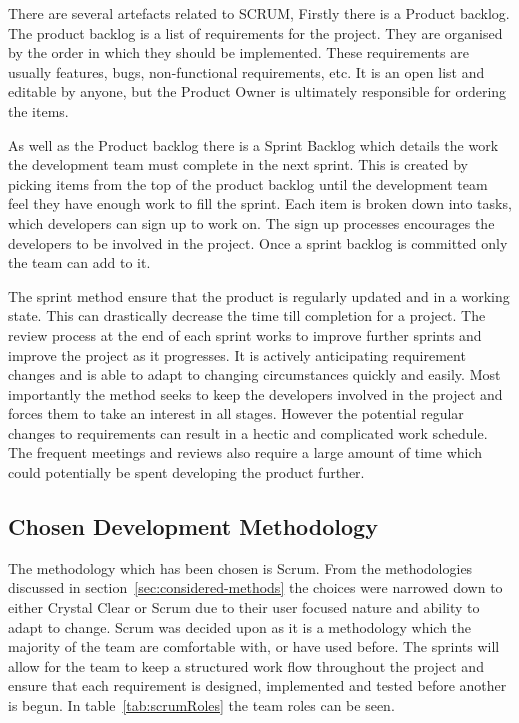 \documentclass[11pt,a4paper]{article}
\begin{document}
There are several artefacts related to SCRUM, Firstly there is a Product backlog. The product backlog is a list of requirements for the project. They are organised by the order in which they should be implemented. These requirements are usually features, bugs, non-functional requirements, etc. It is an open list and editable by anyone, but the Product Owner is ultimately responsible for ordering the items. 

As well as the Product backlog there is a Sprint Backlog which details the work the development team must complete in the next sprint. This is created by picking items from the top of the product backlog until the development team feel they have enough work to fill the sprint. Each item is broken down into tasks, which developers can sign up to work on. The sign up processes encourages the developers to be involved in the project. Once a sprint backlog is committed only the team can add to it.

The sprint method ensure that the product is regularly updated and in a working state. This can drastically decrease the time till completion for a project. The review process at the end of each sprint works to improve further sprints and improve the project as it progresses. It is actively anticipating requirement changes and is able to adapt to changing circumstances quickly and easily. Most importantly the method seeks to keep the developers involved in the project and forces them to take an interest in all stages. However the potential regular changes to requirements can result in a hectic and complicated work schedule. The frequent meetings and reviews also require a large amount of time which could potentially be spent developing the product further. 

\subsection{Chosen Development Methodology}
\label{sec:chosen-method}

The methodology which has been chosen is Scrum. From the methodologies discussed in section~\ref{sec:considered-methods} the choices were narrowed down to either Crystal Clear or Scrum due to their user focused nature and ability to adapt to change. Scrum was decided upon as it is a methodology which the majority of the team are comfortable with, or have used before. The sprints will allow for the team to keep a structured work flow throughout the project and ensure that each requirement is designed, implemented and tested before another is begun. In table~\ref{tab:scrumRoles} the team roles can be seen.
\end{document}
